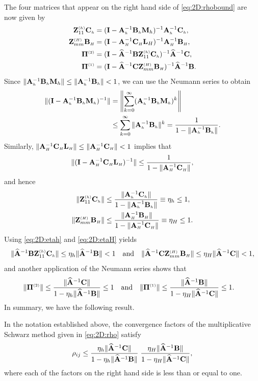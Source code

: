 The four matrices that appear on the right hand side of \eqref{eq:2D:rhobound}
are now given by
%
\begin{align*}
\Z_{11}^{\klein{(h)}}\matCh &= (\I-\matAh^{-1}\matBh \M_h)^{-1}\matAh^{-1}\matCh,\\
\Z_{mm}^{\klein{(H)}}\matBH &= (\I-\matAH^{-1}\matCH \L_H)^{-1}\matAH^{-1}\matBH,\\
\PiTwo &= (\I-\matA^{-1}\matB \Z_{11}^{\klein{(h)}}\matCh)^{-1}\matA^{-1}\matC,\\
\PiOne
&= (\I-\matA^{-1}\matC \Z_{mm}^{\klein{(H)}}\matBH)^{-1}\matA^{-1}\matB.
\end{align*}
%
Since $\|\matAh^{-1}\matBh \M_h\|\leq \|\matAh^{-1}\matBh\| <1$, we can use the
Neumann series to obtain
%
\begin{align*}
\|(\I-\matAh^{-1}\matBh \M_{\klein{h}})^{-1}\| &=
\left\|\sum_{k=0}^\infty (\matAh^{-1}\matBh \M_{\klein{h}})^k\right\|\\
&\leq \sum_{k=0}^\infty \|\matAh^{-1}\matBh\|^k =
\frac{1}{1-\|\matAh^{-1}\matBh\|}.
\end{align*}
%
Similarly, $\|\matAH^{-1}\matCH \L_{\klein{H}}\|\leq \|\matAH^{-1}\matCH\| <1$
implies that
%
$$\|(\I-\matAH^{-1}\matCH \L_{\klein{H}})^{-1}\|\leq \frac{1}{1-\|\matAH^{-1}\matCH\|},$$
%
and hence
%
\begin{align}
\|\Z_{11}^{\klein{(h)}}\matCh\| &\leq
\frac{\|\matAh^{-1}\matCh\|}{1-\|\matAh^{-1}\matBh\|}
\equiv \eta_h \leq 1, \label{eq:2D:etah} \\
\|\Z_{mm}^{\klein{(H)}}\matBH\| &\leq
\frac{\|\matAH^{-1}\matBH\|}{1-\|\matAH^{-1}\matCH\|}
\equiv \eta_H \leq 1.\label{eq:2D:etaH}
\end{align}
%
Using \eqref{eq:2D:etah} and \eqref{eq:2D:etaH} yields
%
$$\|\matA^{-1}\matB \Z_{11}^{\klein{(h)}}\matCh\|\leq \eta_h
\|\matA^{-1}\matB\| <1\quad\mbox{and}\quad
\|\matA^{-1}\matC \Z_{mm}^{\klein{(H)}}\matBH\|\leq \eta_H
\|\matA^{-1}\matC\| <1,$$
%
and another application of the Neumann series shows that
%
\begin{align}\label{eq:2D:Sh}
\|\PiTwo\| &\leq
\frac{\|\matA^{-1}\matC\|}{1-\eta_h \|\matA^{-1}\matB\|}\leq 1
\quad \mbox{and} \quad
\|\PiOne\| \leq
\frac{\|\matA^{-1}\matB\|}{1-\eta_H \|\matA^{-1}\matC\|}\leq 1.
\end{align}
%
In summary, we have the following result.
\begin{lemma}\label{lem:2D:rho}
In the notation established above, the convergence factors of the multiplicative
Schwarz method given in \eqref{eq:2D:rho} satisfy
%
\begin{equation}\label{eq:2D:rhoij}
\rho_{ij}\leq
\frac{\eta_h \|\matA^{-1}\matC\|}{1-\eta_h \|\matA^{-1}\matB\|}\;
\frac{\eta_H\|\matA^{-1}\matB\|}{1-\eta_H\|\matA^{-1}\matC\|},
\end{equation}
%
where each of the factors on the right hand side is less than or equal to one.
\end{lemma}


